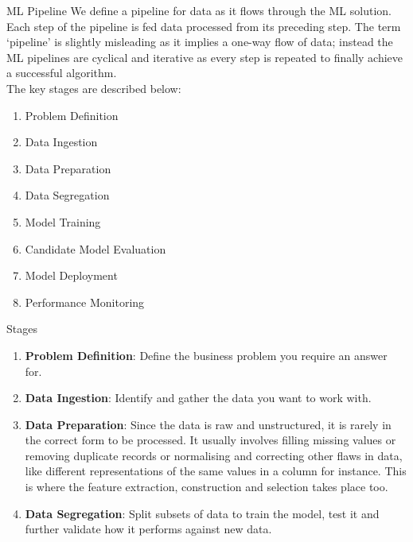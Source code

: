 \documentclass{beamer}
\begin{document}
\begin{frame}{ML Pipeline}
	\justify
		We define a pipeline for data as it flows through the ML solution. Each step of the pipeline is fed data processed from its preceding step. The term ‘pipeline’ is slightly misleading as it implies a one-way flow of data; instead the ML pipelines are cyclical and iterative as every step is repeated to finally achieve a successful algorithm.\\
\vspace{10pt}
	The key stages are described below:
	\begin{enumerate}
		\item Problem Definition
		\item Data Ingestion
		\item Data Preparation
		\item Data Segregation
		\item Model Training
		\item Candidate Model Evaluation
		\item Model Deployment
		\item Performance Monitoring
	\end{enumerate}
\end{frame}
\begin{frame}{Stages}
	\begin{enumerate}
		\item \textbf{Problem Definition}: Define the business problem you require an answer for.
		\item \textbf{Data Ingestion}: Identify and gather the data you want to work with.
		\item \textbf{Data Preparation}:  Since the data is raw and unstructured, it is rarely in the correct form to be processed. It usually involves filling missing values or removing duplicate records or normalising and correcting other flaws in data, like different representations of the same values in a column for instance. This is where the feature extraction, construction and selection takes place too.
		\item \textbf{Data Segregation}: Split subsets of data to train the model, test it and further validate how it performs against new data.
	\end{enumerate}
\end{frame}
\end{document}
